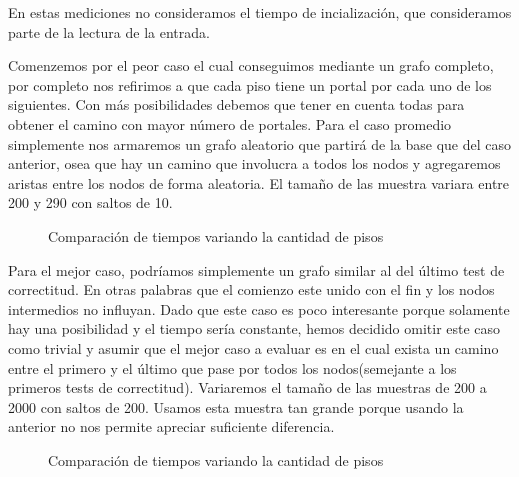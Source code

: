 En estas mediciones no consideramos el tiempo de incialización, que consideramos parte de la lectura de la entrada.

 Comenzemos por el peor caso el cual conseguimos mediante un grafo completo, por completo nos 
refirimos a que cada piso tiene un portal por cada uno de los siguientes. Con más posibilidades debemos que tener en cuenta todas para obtener el camino con mayor número 
de portales. Para el caso promedio simplemente nos armaremos un grafo aleatorio que partirá de la base que del caso anterior, osea que hay un camino que involucra a todos los 
nodos y agregaremos aristas entre los nodos de forma aleatoria. El tamaño de las muestra variara entre 200 y 290 con saltos de 10.

\begin{figure}[H]

\caption{Comparación de tiempos variando la cantidad de pisos}
\end{figure}

Para el mejor caso, podríamos simplemente un grafo similar al del último test de correctitud. En otras palabras que el comienzo este unido con el fin y los nodos intermedios 
no influyan. Dado que este caso es poco interesante porque solamente hay una posibilidad y el tiempo sería constante, hemos decidido omitir este caso como trivial y asumir que el 
mejor caso a evaluar es en el cual exista un camino entre el primero y el último que pase por todos los nodos(semejante a los primeros tests de correctitud). Variaremos el 
tamaño de las muestras de 200 a 2000 con saltos de 200. Usamos esta muestra tan grande porque usando la anterior no nos permite apreciar suficiente diferencia.

\begin{figure}[H]

\caption{Comparación de tiempos variando la cantidad de pisos}
\end{figure}


